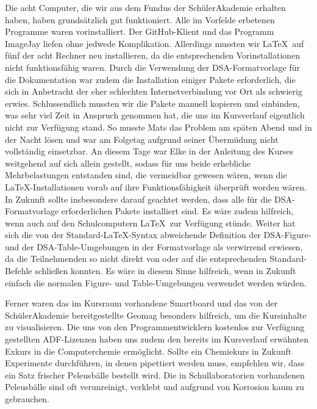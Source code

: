 \documentclass{scrartcl}
\begin{document}
Die acht Computer, die wir aus dem Fundus der Sch{\"u}lerAkademie erhalten haben, haben grunds{\"a}tzlich gut funktioniert. Alle im Vorfelde erbetenen Programme waren vorinstalliert. Der GitHub-Klient und das Programm ImageJay liefen ohne jedwede Komplikation. Allerdings mussten wir \LaTeX\ auf f{\"u}nf der acht Rechner neu installieren, da die entsprechenden Vorinstallationen nicht funktionsf{\"a}hig waren. Durch die Verwendung der DSA-Formatvorlage f{\"u}r die Dokumentation war zudem die Installation einiger Pakete erforderlich, die sich in Anbetracht der eher schlechten Internetverbindung vor Ort als schwierig erwies. Schlussendlich mussten wir die Pakete manuell kopieren und einbinden, was sehr viel Zeit in Anspruch genommen hat, die uns im Kursverlauf eigentlich nicht zur Verf{\"u}gung stand. So musste Mats das Problem am sp{\"a}ten Abend und in der Nacht l{\"o}sen und war am Folgetag aufgrund seiner {\"U}berm{\"u}dung nicht vollst{\"a}ndig einsetzbar. An diesem Tage war Elke in der Anleitung des Kurses weitgehend auf sich allein gestellt, sodass f{\"u}r uns beide erhebliche Mehrbelastungen entstanden sind, die vermeidbar gewesen w{\"a}ren, wenn die \LaTeX -Installationen vorab auf ihre Funktionsf{\"a}higkeit {\"u}berpr{\"u}ft worden w{\"a}ren. In Zukunft sollte insbesondere darauf geachtet werden, dass alle f{\"u}r die DSA-Formatvorlage erforderlichen Pakete installiert sind. Es w{\"a}re zudem hilfreich, wenn auch auf den Schulcomputern \LaTeX\ zur Verf{\"u}gung st{\"u}nde. Weiter hat sich die von der Standard-\LaTeX -Syntax abweichende Definition der DSA-Figure- und der DSA-Table-Umgebungen in der Formatvorlage als verwirrend erwiesen, da die Teilnehmenden so nicht direkt von oder auf die entsprechenden Standard-Befehle schlie{\ss}en konnten. Es w{\"a}re in diesem Sinne hilfreich, wenn in Zukunft einfach die normalen Figure- und Table-Umgebungen verwendet werden w{\"u}rden.\medskip

Ferner waren das im Kursraum vorhandene Smartboard und das von der Sch{\"u}lerAkademie bereitgestellte Geomag besonders hilfreich, um die Kursinhalte zu visualisieren. Die uns von den Programmentwicklern kostenlos zur Verf{\"u}gung gestellten ADF-Lizenzen haben uns zudem den bereits im Kursverlauf erw{\"a}hnten Exkurs in die Computerchemie erm{\"o}glicht. Sollte ein Chemiekurs in Zukunft Experimente durchf{\"u}hren, in denen pipettiert werden muss, empfehlen wir, dass ein Satz frischer Peleusb{\"a}lle bestellt wird. Die in Schullaboratorien vorhandenen Peleusb{\"a}lle sind oft verunreinigt,
verklebt und aufgrund von Korrosion kaum zu gebrauchen.\medskip
\end{document}
